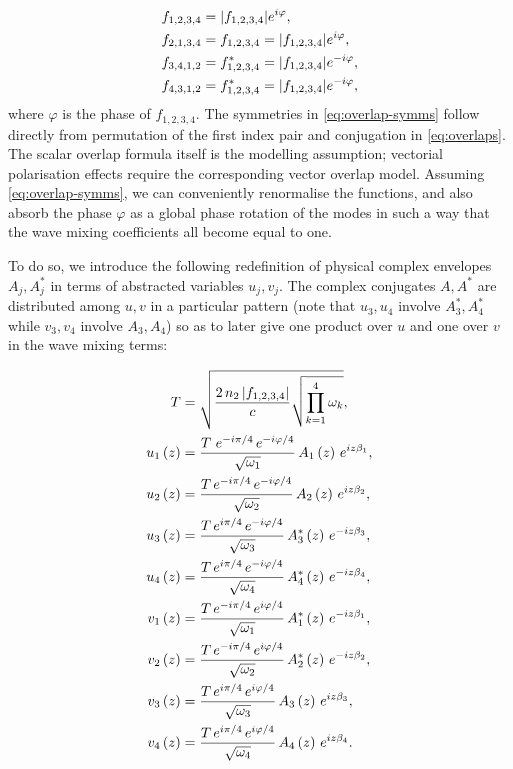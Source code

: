 \documentclass[11pt,a4paper]{article}
\begin{document}
\begin{align}
f_{1,2,3,4} &= |f_{1,2,3,4}|e^{i\varphi}, \notag \\
f_{2,1,3,4} &= f_{1,2,3,4} = |f_{1,2,3,4}|e^{i\varphi}, \notag \\
f_{3,4,1,2} &= f_{1,2,3,4}^* = |f_{1,2,3,4}|e^{-i\varphi}, \notag \\
f_{4,3,1,2} &= f_{1,2,3,4}^* = |f_{1,2,3,4}|e^{-i\varphi}, \label{eq:overlap-symms}
\end{align}
where $\varphi$ is the phase of $f_{1,2,3,4}$.
The symmetries in \eqref{eq:overlap-symms} follow directly from permutation of the first index pair and conjugation in \eqref{eq:overlaps}.
The scalar overlap formula itself is the modelling assumption; vectorial polarisation effects require the corresponding vector overlap model.
Assuming \eqref{eq:overlap-symms}, we can conveniently renormalise the functions, and also absorb the phase $\varphi$ as a global phase rotation of the modes in such a way that the wave mixing coefficients all become equal to one.

To do so, we introduce the following redefinition of physical complex envelopes $A_j, A^*_j$ in terms of abstracted variables $u_j,v_j$.
The complex conjugates $A, A^*$ are distributed among $u,v$ in a particular pattern (note that $u_3, u_4$ involve $A^*_3, A^*_4$ while $v_3, v_4$ involve $A_3, A_4$) so as to later give one product over $u$ and one over $v$ in the wave mixing terms:

\begin{align}
T &= \sqrt{\frac{2\,n_2 \left|f_{1,2,3,4}\right|}{c} \sqrt{ \prod\limits_{k=1}^{4} \omega_k}}, \label{eq:T-def} \\
u_1\left(z\right) &= \frac{T\,\,e^{-i\pi/4}\,e^{-i\varphi/4}}{\sqrt{\omega_{1}}} \,A_{1}\left(z\right)\,e^{i z \beta_{1}}, \notag \\
u_2\left(z\right) &= \frac{T\,e^{-i\pi/4}\,e^{-i\varphi/4}}{\sqrt{\omega_{2}}}\,A_{2}\left(z\right)\,e^{i z \beta_{2}}, \notag \\
u_3\left(z\right) &= \frac{T\,e^{i\pi/4}\,e^{-i\varphi/4}}{\sqrt{\omega_{3}}}\,A^*_{3}\left(z\right)\,e^{-i z \beta_{3}}, \notag \\
u_4\left(z\right) &= \frac{T\,e^{i\pi/4}\,e^{-i\varphi/4}}{\sqrt{\omega_{4}}}\,A^*_{4}\left(z\right)\,e^{-i z \beta_{4}}, \notag \\
v_1\left(z\right) &= \frac{T\,e^{-i\pi/4}\,e^{i\varphi/4}}{\sqrt{\omega_{1}}}\,A^*_{1}\left(z\right)\,e^{-i z \beta_{1}}, \notag \\
v_2\left(z\right) &= \frac{T\,e^{-i\pi/4}\,e^{i\varphi/4}}{\sqrt{\omega_{2}}}\,A^*_{2}\left(z\right)\,e^{-i z \beta_{2}}, \notag \\
v_3\left(z\right) &= \frac{T\,e^{i\pi/4}\,e^{i\varphi/4}}{\sqrt{\omega_{3}}}\,A_{3}\left(z\right)\,e^{i z \beta_{3}}, \notag \\
v_4\left(z\right) &= \frac{T\,e^{i\pi/4}\,e^{i\varphi/4}}{\sqrt{\omega_{4}}}\,A_{4}\left(z\right)\,e^{i z \beta_{4}}. \label{eq:u-v-A}
\end{align}
\end{document}
